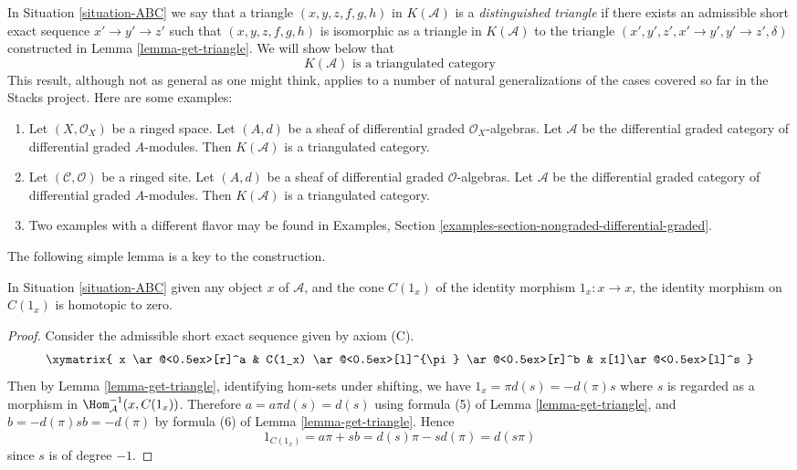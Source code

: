 \noindent
In Situation \ref{situation-ABC} we say that a triangle
$(x, y, z, f, g, h)$ in $K(\mathcal{A})$ is a
{\it distinguished triangle} if there exists an admissible
short exact sequence $x' \to y' \to z'$ such that
$(x, y, z, f, g, h)$ is isomorphic as a triangle in $K(\mathcal{A})$
to the triangle $(x', y', z', x' \to y', y' \to z', \delta)$
constructed in Lemma \ref{lemma-get-triangle}. We will show below that
$$
\boxed{
K(\mathcal{A})\text{ is a triangulated category}
}
$$
This result, although not as general as one might think, applies to a
number of natural generalizations of the cases covered so far in the
Stacks project. Here are some examples:
\begin{enumerate}
\item Let $(X, \mathcal{O}_X)$ be a ringed space. Let $(A, d)$ be a
sheaf of differential graded $\mathcal{O}_X$-algebras. Let
$\mathcal{A}$ be the differential graded category of differential
graded $A$-modules. Then $K(\mathcal{A})$ is a triangulated category.
\item Let $(\mathcal{C}, \mathcal{O})$ be a ringed site. Let $(A, d)$ be a
sheaf of differential graded $\mathcal{O}$-algebras. Let
$\mathcal{A}$ be the differential graded category of differential
graded $A$-modules. Then $K(\mathcal{A})$ is a triangulated category.
\item Two examples with a different flavor may be found in Examples, Section
\ref{examples-section-nongraded-differential-graded}.
\end{enumerate}

\noindent
The following simple lemma is a key to the construction.

\begin{lemma}
\label{lemma-id-cone-null}
In Situation \ref{situation-ABC}
given any object $x$ of $\mathcal{A}$, and the cone $C(1_x)$ of the
identity morphism $1_x : x \to x$, the identity morphism on
$C(1_x)$ is homotopic to zero.
\end{lemma}

\begin{proof}
Consider the admissible short exact sequence given by axiom (C).
$$
\xymatrix{
x \ar@<0.5ex>[r]^a  &
C(1_x) \ar@<0.5ex>[l]^{\pi} \ar@<0.5ex>[r]^b &
x[1]\ar@<0.5ex>[l]^s
}
$$
Then by Lemma \ref{lemma-get-triangle}, identifying hom-sets under
shifting, we have $1_x=\pi d(s)=-d(\pi)s$ where $s$ is regarded as
a morphism in $\Hom_{\mathcal{A}}^{-1}(x,C(1_x))$. Therefore
$a=a\pi d(s)=d(s)$ using formula (5) of Lemma \ref{lemma-get-triangle},
and $b=-d(\pi)sb=-d(\pi)$ by formula (6) of Lemma \ref{lemma-get-triangle}.
Hence
$$
1_{C(1_x)} = a\pi + sb = d(s)\pi - sd(\pi) = d(s\pi)
$$
since $s$ is of degree $-1$.
\end{proof}

